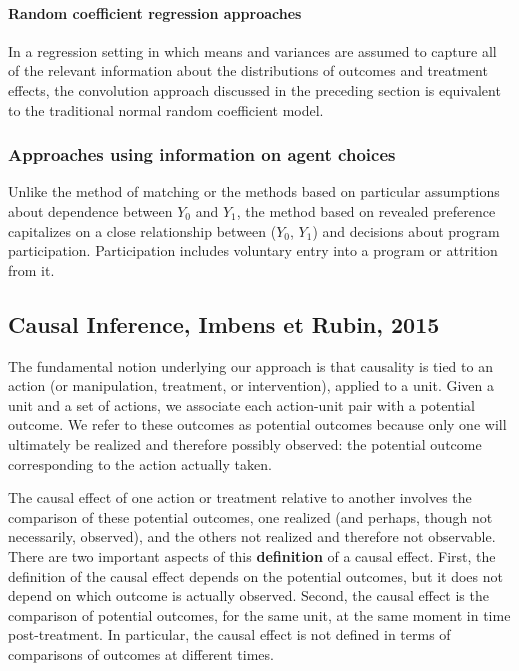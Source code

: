 \documentclass[12pt]{article}
\theoremstyle{definition}
\begin{document}
\paragraph{Random coefficient regression approaches}
In a regression setting in which means and variances are assumed to capture all of the relevant information about the distributions of outcomes and treatment effects, the convolution approach discussed in the preceding section is equivalent to the traditional normal random coefficient model.


\subsubsection{Approaches using information on agent choices}
Unlike the method of matching or the methods based on particular assumptions about dependence between $Y_0$ and $Y_1$, the method based on revealed preference capitalizes on a close relationship between ($Y_0$, $Y_1$) and decisions about program participation. Participation includes voluntary entry into a program or attrition from it.

\pagebreak
\subsection{Causal Inference, Imbens et Rubin, 2015}
The fundamental notion underlying our approach is that causality is tied to an action (or manipulation, treatment, or intervention), applied to a unit. Given a unit and a set of actions, we associate each action-unit pair with a potential outcome. We refer to these outcomes as potential outcomes because only one will ultimately be realized and therefore possibly observed: the potential outcome corresponding to the action actually taken.

The causal effect of one action or treatment relative to another involves the comparison of these potential outcomes, one realized (and perhaps, though not necessarily, observed), and the others not realized and therefore not observable. There are two important aspects of this \textbf{definition} of a causal effect. First, the definition of the causal effect depends on the potential outcomes, but it does not depend on which outcome is actually observed. Second, the causal effect is the comparison of potential outcomes, for the same unit, at the same moment in time post-treatment. In particular, the causal effect is not defined in terms of comparisons of outcomes at different times.
\end{document}
